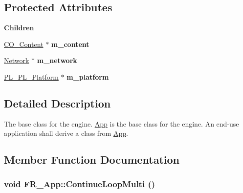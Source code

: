 \subsection*{Protected Attributes}
\begin{Indent}{\bf Children}\par
{\em \label{_amgrp64e4aca4297806247f62a7b5f8cbd3df}
 }\begin{DoxyCompactItemize}
\item 
\hypertarget{classFramework_1_1App_a79d0c566e84ab31e22d0cec1e75f75d8}{
\hyperlink{classContent_1_1Content}{CO\_\-Content} $\ast$ {\bfseries m\_\-content}}
\label{classFramework_1_1App_a79d0c566e84ab31e22d0cec1e75f75d8}

\item 
\hypertarget{classFramework_1_1App_a3e14a3ffd0c1bbf31f077e8b21e0c948}{
\hyperlink{classNetwork}{Network} $\ast$ {\bfseries m\_\-network}}
\label{classFramework_1_1App_a3e14a3ffd0c1bbf31f077e8b21e0c948}

\item 
\hypertarget{classFramework_1_1App_a13431973832c140740a60a689e117da5}{
\hyperlink{classPlatform_1_1Platform_1_1Platform}{PL\_\-PL\_\-Platform} $\ast$ {\bfseries m\_\-platform}}
\label{classFramework_1_1App_a13431973832c140740a60a689e117da5}

\end{DoxyCompactItemize}
\end{Indent}


\subsection{Detailed Description}
The base class for the engine. \hyperlink{classFramework_1_1App}{App} is the base class for the engine. An end-\/use application shall derive a class from \hyperlink{classFramework_1_1App}{App}. 

\subsection{Member Function Documentation}
\hypertarget{classFramework_1_1App_a461233c52431769604fcf89a8a2fa4bc}{
\subsubsection[{ContinueLoopMulti}]{\setlength{\rightskip}{0pt plus 5cm}void FR\_\-App::ContinueLoopMulti ()}}
\label{classFramework_1_1App_a461233c52431769604fcf89a8a2fa4bc}


